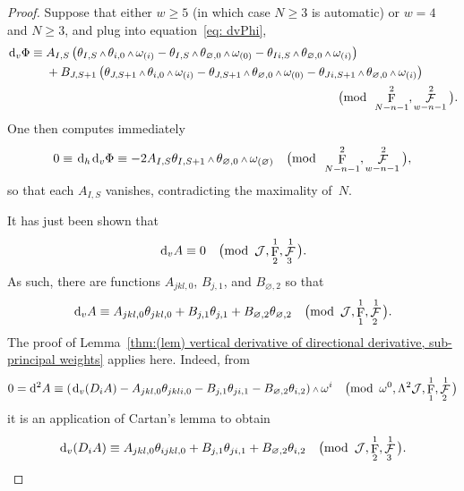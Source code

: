 \documentclass[10pt,a4paper]{amsart}
\renewcommand{\d}{{\rm d}}
\renewcommand{\mod}[1]{\quad\big(\mathrm{mod\enspace} #1\big)}
\newcommand{\w}{{\mathchoice{\,{\scriptstyle\wedge}\,}{{\scriptstyle\wedge}}
 {{\scriptscriptstyle\wedge}}{{\scriptscriptstyle\wedge}}}}
\newcommand{\thetas}[1]{\theta_{#1}}
\newcommand{\thetanot}{\thetas{\varnothing,0}}
\newcommand{\omegas}[1]{\omega_{(#1)}}
\DeclareMathOperator{\pwf}{F}
\DeclareMathOperator{\swf}{\mathcal{F}}
\renewcommand{\dh}{\ensuremath{\hspace{1pt} \d_h}}
\newcommand{\dv}{\ensuremath{\hspace{1pt} \d_v}}
\newcommand{\cartTheta}{\mathcal{J}}
\numberwithin{equation}{section}
\begin{document}
\begin{proof}
 Suppose that either $w \ge 5$ (in which case $N \ge 3$ is automatic) or $w = 4$ and $N \ge 3$, and plug into equation~\eqref{eq: dvPhi},
 \begin{align*}
 \dv\Phi \equiv{}&{ }A_{I,S}\left(\thetas{I,S}\w\thetas{i,0}\w\omegas{i} - \thetas{I,S}\w\thetanot\w\omegas{0} - \thetas{Ii,S}\w\thetas{\varnothing,0}\w\omegas{i}\right) \\
 & + B_{J,S+1}\left(\thetas{J,S+1}\w\thetas{i,0}\w\omegas{i} - \thetas{J,S+1}\w\thetanot\w\omegas{0} - \thetas{Ji,S+1}\w\thetas{\varnothing,0}\w\omegas{i}\right) \\
 & \hspace*{82mm}\mod{\pwf^2_{N-n-1}, \swf^2_{w-n-1}} .
 \end{align*}
 One then computes immediately
 \begin{gather*}
 0 \equiv \dh\dv\Phi \equiv -2A_{I,S}\thetas{I,S+1}\w\thetanot\w\omegas{\varnothing} \mod{\pwf^2_{N-n-1}, \swf^2_{w-n-1}} ,
 \end{gather*}
 so that each $A_{I,S}$ vanishes, contradicting the maximality of~$N$.

 It has just been shown that
 \begin{gather*}
 \dv A \equiv 0 \mod{\cartTheta, \pwf^1_2, \swf^1_3} .
 \end{gather*}
 As such, there are functions $A_{jkl,0}$, $B_{j,1}$, and $B_{\varnothing,2}$ so that
 \begin{gather*}
 \dv A \equiv A_{jkl,0}\thetas{jkl,0} + B_{j,1}\thetas{j,1} + B_{\varnothing,2}\thetas{\varnothing,2} \mod{\cartTheta, \pwf^1_{1}, \swf^1_{2}} .
 \end{gather*}
 The proof of Lemma~\ref{thm:(lem) vertical derivative of directional derivative, sub-principal weights} applies here. Indeed, from
 \begin{gather*}
 0 = \d^2 A \equiv (\dv(D_i A) - A_{jkl,0}\thetas{jkli,0} - B_{j,1}\thetas{ji,1} - B_{\varnothing,2}\thetas{i,2})\w\omega^i \mod{\omega^0, \Lambda^2\cartTheta, \pwf^1_{1}, \swf^1_{2}}
 \end{gather*}
 it is an application of Cartan's lemma to obtain
 \begin{gather*}
 \dv(D_i A) \equiv A_{jkl,0}\thetas{ijkl,0} + B_{j,1}\thetas{ji,1} + B_{\varnothing,2}\thetas{i,2} \mod{\cartTheta, \pwf^1_{2}, \swf^1_{3}} .
 \end{gather*}


\end{proof}
\end{document}
